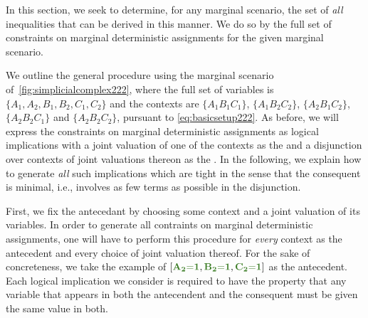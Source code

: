 In this section, we seek to determine, for any marginal scenario, the set of \emph{all} inequalities that can be derived in this manner.  We do so by  the full set of constraints on marginal deterministic assignments for the given marginal scenario.

We outline the general procedure using 
the marginal scenario of~\cref{fig:simplicialcomplex222}, where the full set of variables is $\{ A_1, A_2, B_1, B_2, C_1, C_2\}$ and the contexts are $\{A_1 B_1 C_1\}$, $\{A_1 B_2 C_2\}$, $\{A_2 B_1 C_2\}$, $\{A_2 B_2 C_1\}$ and $\{A_2 B_2 C_2\}$, pursuant to \cref{eq:basicsetup222}.
As before, we will express the constraints on marginal deterministic assignments as logical implications with
a joint valuation of one of the contexts as the  and a disjunction over contexts of joint valuations thereon as the . In the following, we explain how to generate \emph{all} such implications which are tight in the sense that the consequent is minimal, i.e., involves as few terms as possible in the disjunction. 

First, we fix the antecedant by choosing some context and a joint valuation of its variables. In order to generate all contraints on marginal deterministic assignments, one will have to perform this procedure for \emph{every} context as the antecedent and every choice of joint valuation thereof. For the sake of concreteness, we take the example of $\bracks{\mgreen{A_2 \eql 1}, \mgreen{B_2 \eql 1}, \mgreen{C_2 \eql 1}}$ as the antecedent.  
Each logical implication we consider is required to have the property 
 that any variable that appears in both the antecendent and the consequent must be given the same value in both. 

